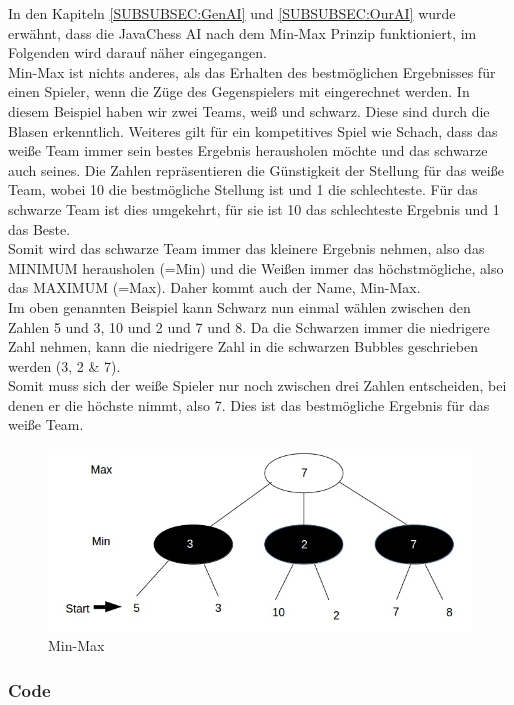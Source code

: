 \documentclass[12pt,a4paper]{article}
\begin{document}
In den Kapiteln \ref{SUBSUBSEC:GenAI} und \ref{SUBSUBSEC:OurAI} wurde erwähnt, dass die JavaChess AI nach dem Min-Max Prinzip funktioniert, im Folgenden wird darauf näher eingegangen.\\[2ex]
Min-Max ist nichts anderes, als das Erhalten des bestmöglichen Ergebnisses für einen Spieler, wenn die Züge des Gegenspielers mit eingerechnet werden. In diesem Beispiel haben wir zwei Teams, weiß und schwarz. Diese sind durch die Blasen erkenntlich. Weiteres gilt für ein kompetitives Spiel wie Schach, dass das weiße Team immer sein bestes Ergebnis herausholen möchte und das schwarze auch seines. Die Zahlen repräsentieren die Günstigkeit der Stellung für das weiße Team, wobei 10 die bestmögliche Stellung ist und 1 die schlechteste. Für das schwarze Team ist dies umgekehrt, für sie ist 10 das schlechteste Ergebnis und 1 das Beste. \\
Somit wird das schwarze Team immer das kleinere Ergebnis nehmen, also das MINIMUM herausholen (=Min) und die Weißen immer das höchstmögliche, also das MAXIMUM (=Max). Daher kommt  auch der Name, Min-Max. \\
Im oben genannten Beispiel kann Schwarz nun einmal wählen zwischen den Zahlen 5 und 3, 10 und 2 und 7 und 8. Da die Schwarzen immer die niedrigere Zahl nehmen, kann die niedrigere Zahl in die schwarzen Bubbles geschrieben werden (3, 2 \& 7). \\
Somit muss sich der weiße Spieler nur noch zwischen drei Zahlen entscheiden, bei denen er die höchste nimmt, also 7. Dies ist das bestmögliche Ergebnis für das weiße Team.
\begin{figure}[H]
  \centering
   	\includegraphics[width=16cm]{graphics/MinMax.jpg}
  \caption{Min-Max}
  \label{FIG:MINMAX}
\end{figure}

\subsubsection{Code}
\label{SUBSUBSEC:AICODE}
\end{document}
